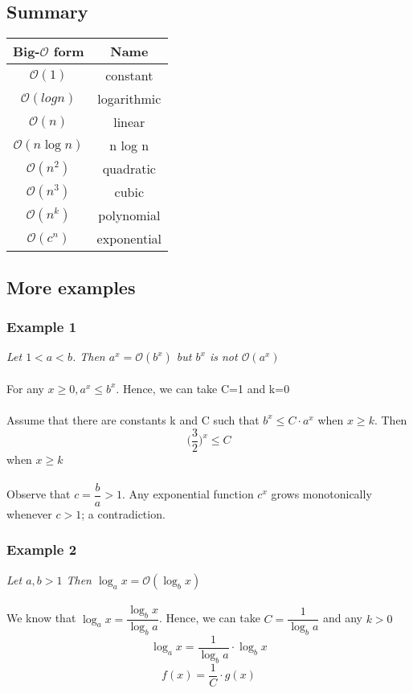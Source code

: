 \documentclass{article}[18pt]
\begin{document}
\subsection{Summary}
\begin{tabular}{|c|c|}
	\hline 
	Big-$\mathcal{O}$ form & Name \\ 
	\hline 
	$\mathcal{O}(1)$ & constant \\ 
	\hline 
	$\mathcal{O}(log n)$ & logarithmic \\ 
	\hline 
	$\mathcal{O}(n)$ & linear \\ 
	\hline 
	$\mathcal{O}(n\log n)$ & n log n \\ 
	\hline 
	$\mathcal{O}(n^2)$ & quadratic \\ 
	\hline 
	$\mathcal{O}(n^3)$ & cubic \\ 
	\hline 
	$\mathcal{O}(n^k)$ & polynomial \\ 
	\hline 
	$\mathcal{O}(c^n)$ & exponential \\ 
	\hline 
\end{tabular} 
\subsection{More examples}
\subsubsection{Example 1}
\textit{Let $1<a<b$. Then $a^x=\mathcal{O}(b^x)$ but $b^x$ is not $\mathcal{O}(a^x)$}\\
\\
For any $x\geqslant0, a^x\leqslant b^x$. Hence, we can take C=1 and k=0\\
\\
Assume that there are constants k and C such that $b^x\leqslant C\cdot a^x$ when $x\geqslant k$. Then
$$\Bigg(\dfrac{3}{2}\Bigg)^x\leqslant C$$
when $x\geqslant k$\\
\\
Observe that $c=\dfrac{b}{a}>1$. Any exponential function $c^x$ grows monotonically whenever $c>1$; a contradiction.
\subsubsection{Example 2}
\textit{Let $a,b>1$ Then $\log_ax=\mathcal{O}(\log_bx)$}\\
\\
We know that $\log_ax=\dfrac{\log_bx}{\log_ba}$. Hence, we can take $C=\dfrac{1}{\log_ba}$ and any $k>0$
$$\log_ax=\dfrac{1}{\log_ba}\cdot \log_bx$$
$$f(x)=\frac{1}{C}\cdot g(x)$$
\end{document}
